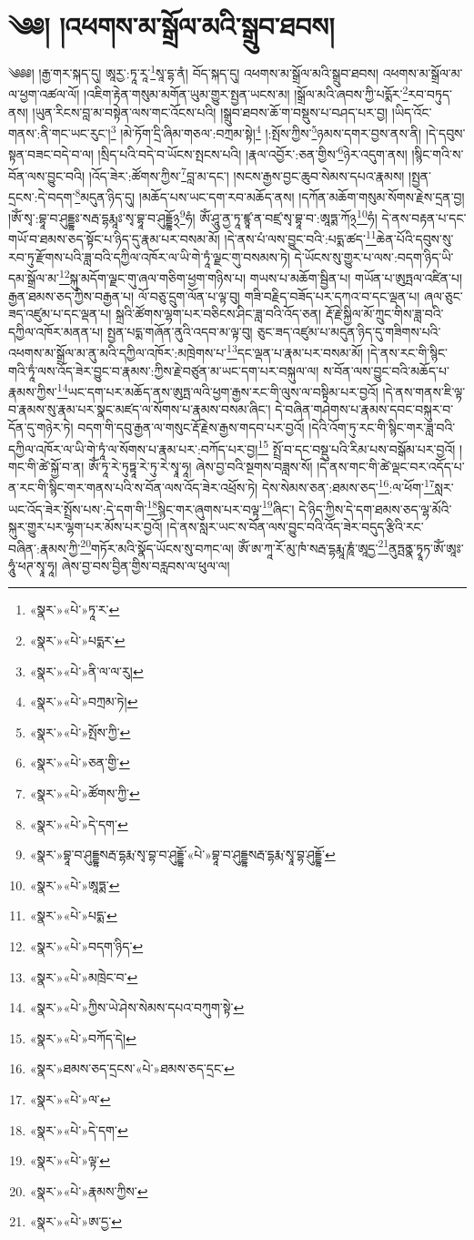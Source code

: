 \chapter{༄༅། །འཕགས་མ་སྒྲོལ་མའི་སྒྲུབ་ཐབས།}༄༅༅། །རྒྱ་གར་སྐད་དུ། ཨཱརྱ་:ཏཱ་རཱ་\footnote{«སྣར་»«པེ་»ཏཱ་ར་}སཱ་དྷ་ནཾ། བོད་སྐད་དུ། འཕགས་མ་སྒྲོལ་མའི་སྒྲུབ་ཐབས། འཕགས་མ་སྒྲོལ་མ་ལ་ཕྱག་འཚལ་ལོ། །འཇིག་རྟེན་གསུམ་མགོན་ཡུམ་གྱུར་སྤྱན་ཡངས་མ། །སྒྲོལ་མའི་ཞབས་ཀྱི་པདྨོར་\footnote{«སྣར་»«པེ་»པདྨར་}རབ་བཏུད་ནས། །ཡུན་རིངས་བླ་མ་བསྟེན་ལས་གང་འོངས་པའི། །སྒྲུབ་ཐབས་ཆོ་ག་བསྡུས་པ་བཤད་པར་བྱ། །ཡིད་འོང་གནས་:ནི་གང་ཡང་རུང་།\footnote{«སྣར་»«པེ་»ནི་ལ་ལ་རུ།} །མེ་ཏོག་དྲི་ཞིམ་གཅལ་:བཀྲམ་སྟེ།\footnote{«སྣར་»«པེ་»བཀྲམ་ཏེ།} །:སྤོས་ཀྱིས་\footnote{«སྣར་»«པེ་»སྤོས་ཀྱི་}ཉམས་དགར་བྱས་ནས་ནི། །དེ་དབུས་སྟན་བཟང་བདེ་བ་ལ། །སྲིད་པའི་བདེ་བ་ཡོངས་སྤངས་པའི། །རྣལ་འབྱོར་:ཅན་གྱིས་\footnote{«སྣར་»«པེ་»ཅན་གྱི་}ཉེར་འདུག་ནས། །སྙིང་གའི་ས་བོན་ལས་བྱུང་བའི། །འོད་ཟེར་:ཚོགས་ཀྱིས་\footnote{«སྣར་»«པེ་»ཚོགས་ཀྱི་}བླ་མ་དང་། །སངས་རྒྱས་བྱང་ཆུབ་སེམས་དཔའ་རྣམས། །སྤྱན་དྲངས་:དེ་བདག་\footnote{«སྣར་»«པེ་»དེ་དག་}མདུན་ཉིད་དུ། །མཆོད་པས་ཡང་དག་རབ་མཆོད་ནས། །དཀོན་མཆོག་གསུམ་སོགས་རྗེས་དྲན་བྱ། །ཨོཾ་སྭ་:བྷཱ་བ་ཤུདྡྷཿ་སརྦ་དྷརྨཱཿ་སྭ་བྷཱ་བ་ཤུདྡྷོ྅\footnote{«སྣར་»བྷཱ་བ་ཤུདྡྷསརྦ་དྷརྨ་སྭ་བྷ་བ་ཤུདྡྷོ་«པེ་»བྷཱ་བ་ཤུདྡྷསརྦ་དྷརྨ་སྭཱ་བྷ་ཤུདྡྷོ་}ཧཾ། ཨོཾ་ཤཱུ་ནྱ་ཏཱ་ཛྙཱ་ན་བཛྲ་སྭ་བྷཱ་བ་:ཨཱཏྨ་ཀོ྅\footnote{«སྣར་»«པེ་»ཨཱཏྨ་}ཧཾ། དེ་ནས་བརྟན་པ་དང་གཡོ་བ་ཐམས་ཅད་སྟོང་པ་ཉིད་དུ་རྣམ་པར་བསམ་མོ། །དེ་ནས་པཾ་ལས་བྱུང་བའི་:པདྨ་ཚད་\footnote{«སྣར་»«པེ་»པདྨ་}ཆེན་པོའི་དབུས་སུ་རབ་ཏུ་རྫོགས་པའི་ཟླ་བའི་དཀྱིལ་འཁོར་ལ་ཡི་གེ་ཏཱཾ་ལྗང་གུ་བསམས་ཏེ། དེ་ཡོངས་སུ་གྱུར་པ་ལས་:བདག་ཉིད་ཡི་དམ་སྒྲོལ་མ་\footnote{«སྣར་»«པེ་»བདག་ཉིད་}སྐུ་མདོག་ལྗང་གུ་ཞལ་གཅིག་ཕྱག་གཉིས་པ། གཡས་པ་མཆོག་སྦྱིན་པ། གཡོན་པ་ཨུཏྤལ་འཛིན་པ། རྒྱན་ཐམས་ཅད་ཀྱིས་བརྒྱན་པ། ལོ་བཅུ་དྲུག་ལོན་པ་ལྟ་བུ། གཟི་བརྗིད་བཟོད་པར་དཀའ་བ་དང་ལྡན་པ། ཞལ་ཅུང་ཟད་འཛུམ་པ་དང་ལྡན་པ། སྐྲའི་ཚོགས་ལྷག་པར་བཅིངས་ཤིང་ཟླ་བའི་འོད་ཅན། རྡོ་རྗེ་སྐྱིལ་མོ་ཀྲུང་གིས་ཟླ་བའི་དཀྱིལ་འཁོར་མནན་པ། སྤྱན་པདྨ་གཞོན་ནུའི་འདབ་མ་ལྟ་བུ། ཅུང་ཟད་འཛུམ་པ་མདུན་ཉིད་དུ་གཟིགས་པའི་འཕགས་མ་སྒྲོལ་མ་ནུ་མའི་དཀྱིལ་འཁོར་:མཁྲེགས་པ་\footnote{«སྣར་»«པེ་»མཁྲེང་བ་}དང་ལྡན་པ་རྣམ་པར་བསམ་མོ། །དེ་ནས་རང་གི་སྙིང་གའི་ཏཱཾ་ལས་འོད་ཟེར་བྱུང་བ་རྣམས་:ཀྱིས་རྗེ་བཙུན་མ་ཡང་དག་པར་བསྐུལ་ལ། ས་བོན་ལས་བྱུང་བའི་མཆོད་པ་རྣམས་ཀྱིས་\footnote{«སྣར་»«པེ་»ཀྱིས་ཡེ་ཤེས་སེམས་དཔའ་བཀུག་སྟེ་}ཡང་དག་པར་མཆོད་ནས་ཨུཏྤ་ལའི་ཕྱག་རྒྱས་རང་གི་ལུས་ལ་བསྟིམ་པར་བྱའོ། །དེ་ནས་གནས་ཇི་ལྟ་བ་རྣམས་སུ་རྣམ་པར་སྣང་མཛད་ལ་སོགས་པ་རྣམས་བསམ་ཞིང་། དེ་བཞིན་གཤེགས་པ་རྣམས་དབང་བསྐུར་བ་དོན་དུ་གཉེར་ཏེ། བདག་གི་དབུ་རྒྱན་ལ་གསུང་རྡོ་རྗེས་རྒྱས་གདབ་པར་བྱའོ། །དེའི་འོག་ཏུ་རང་གི་སྙིང་གར་ཟླ་བའི་དཀྱིལ་འཁོར་ལ་ཡི་གེ་ཏཱཾ་ལ་སོགས་པ་རྣམ་པར་:བཀོད་པར་བྱ།\footnote{«སྣར་»«པེ་»བཀོད་དེ།} སྤྲོ་བ་དང་བསྡུ་པའི་རིམ་པས་བསྒོམ་པར་བྱའོ། །གང་གི་ཚེ་སྐྱོ་བ་ན། ཨོཾ་ཏཱ་རེ་ཏུཏྟཱ་རེ་ཏུ་རེ་སྭཱ་ཧཱ། ཞེས་བྱ་བའི་སྔགས་བཟླས་སོ། །དེ་ནས་གང་གི་ཚེ་ལྡང་བར་འདོད་པ་ན་རང་གི་སྙིང་གར་གནས་པའི་ས་བོན་ལས་འོད་ཟེར་འཕྲོས་ཏེ། དེས་སེམས་ཅན་:ཐམས་ཅད་\footnote{«སྣར་»ཐམས་ཅད་དྲངས་«པེ་»ཐམས་ཅད་དྲང་}:ལ་ཕོག་\footnote{«སྣར་»«པེ་»ལ་}སླར་ཡང་འོད་ཟེར་སྤྲོས་པས་:དེ་དག་གི་\footnote{«སྣར་»«པེ་»དེ་དག་}སྙིང་གར་ཞུགས་པར་བལྟ་\footnote{«སྣར་»«པེ་»ལྟ་}ཞིང་། དེ་ཉིད་ཀྱིས་དེ་དག་ཐམས་ཅད་ལྷ་མོའི་སྐུར་གྱུར་པར་ལྷག་པར་མོས་པར་བྱའོ། །དེ་ནས་སླར་ཡང་ས་བོན་ལས་བྱུང་བའི་འོད་ཟེར་བདུད་རྩིའི་རང་བཞིན་:རྣམས་ཀྱི་\footnote{«སྣར་»«པེ་»རྣམས་ཀྱིས་}གཏོར་མའི་སྣོད་ཡོངས་སུ་བཀང་ལ། ཨོཾ་ཨ་ཀཱ་རོ་མུ་ཁཾ་སརྦ་དྷརྨཱ་ཎཱཾ་ཨཱདྱ་\footnote{«སྣར་»«པེ་»ཨ་དྱ་}ནུཏྤནྣ་ཏྭཱཏ་ཨོཾ་ཨཱཿ་ཧཱུཾ་ཕཊ་སྭཱ་ཧཱ། ཞེས་བྱ་བས་བྱིན་གྱིས་བརླབས་ལ་ཕུལ་ལ། 